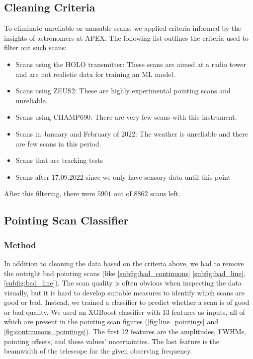 \subsection{Cleaning Criteria}
To eliminate unreliable or unusable scans, we applied criteria informed by the insights of astronomers at APEX.
The following list outlines the criteria used to filter out such scans:
\begin{itemize}
    \item Scans using the HOLO transmitter:
    These scans are aimed at a radio tower and are not realistic data for training an ML model.
    \item Scans using ZEUS2:
    These are highly experimental pointing scans and unreliable.
    \item Scans using CHAMP690: There are very few scans with this instrument.
    \item Scans in January and February of $2022$: The weather is unreliable and there are few scans in this period.
    \item Scans that are tracking tests
    \item Scans after 17.09.2022 since we only have sensory data until this point
\end{itemize}   
After this filtering, there were $5901$ out of $8862$ scans left.
        
\subsection{Pointing Scan Classifier} 
\subsubsection{Method}
In addition to cleaning the data based on the criteria above, we had to remove the outright bad pointing scans (like \ref{subfig:bad_continuous} \ref{subfig:bad_line}, \ref{subfig:bad_line}).
The scan quality is often obvious when inspecting the data visually, but it is hard to develop suitable measures to identify which scans are good or bad.
Instead, we trained a classifier to predict whether a scan is of good or bad quality.
We used an XGBoost classifier with 13 features as inputs, all of which are present in the pointing scan figures (\ref{fig:line_pointings} and \ref{fig:continueous_pointings}).
The first 12 features are the amplitudes, FWHMs, pointing offsets, and these values' uncertainties.
The last feature is the beamwidth of the telescope for the given observing frequency.\\


